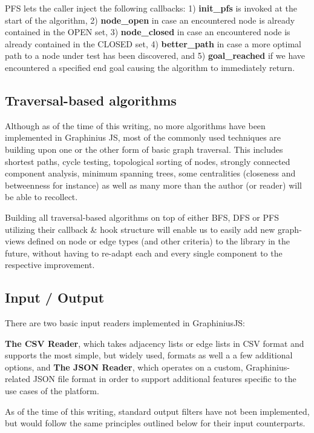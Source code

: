 		PFS lets the caller inject the following callbacks: 1) \textbf{init\_pfs} is invoked at the start of the algorithm, 2) \textbf{node\_open} in case an encountered node is already contained in the OPEN set, 3) \textbf{node\_closed} in case an encountered node is already contained in the CLOSED set, 4) \textbf{better\_path} in case a more optimal path to a node under test has been discovered, and 5) \textbf{goal\_reached} if we have encountered a specified end goal causing the algorithm to immediately return.
		
	\subsection{Traversal-based algorithms}
	\label{ssect:travseral_algos}
	
	Although as of the time of this writing, no more algorithms have been implemented in Graphinius JS, most of the commonly used techniques are building upon one or the other form of basic graph traversal. This includes shortest paths, cycle testing, topological sorting of nodes, strongly connected component analysis, minimum spanning trees, some centralities (closeness and betweenness for instance) as well as many more than the author (or reader) will be able to recollect.
	
	Building all traversal-based algorithms on top of either BFS, DFS or PFS utilizing their callback \& hook structure will enable us to easily add new graph-views defined on node or edge types (and other criteria) to the library in the future, without having to re-adapt each and every single component to the respective improvement.

	
	\subsection{Input / Output}
	\label{ssect:input_output}
	
	There are two basic input readers implemented in GraphiniusJS: 
	
	\textbf{The CSV Reader}, which takes adjacency lists or edge lists in CSV format and supports the most simple, but widely used, formats as well a a few additional options, and
	\textbf{The JSON Reader}, which operates on a custom, Graphinius-related JSON file format in order to support additional features specific to the use cases of the platform.
	
	As of the time of this writing, standard output filters have not been implemented, but would follow the same principles outlined below for their input counterparts.
		
